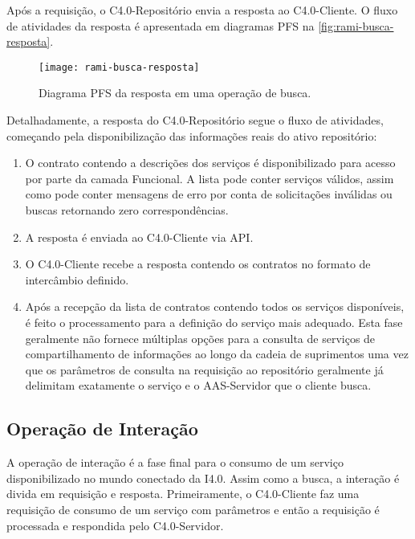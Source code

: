 Após a requisição, o C4.0-Repositório envia a resposta ao C4.0-Cliente. O fluxo de atividades da resposta é apresentada em diagramas PFS na \autoref{fig:rami-busca-resposta}.

\begin{figure}[htb]
	\centering
	\texttt{[image: rami-busca-resposta]}
	\caption{Diagrama PFS da resposta em uma operação de busca.}
	\label{fig:rami-busca-resposta}
\end{figure}

Detalhadamente, a resposta do C4.0-Repositório segue o fluxo de atividades, começando pela disponibilização das informações reais do ativo repositório:

\begin{enumerate}
	\item O contrato contendo a descrições dos serviços é disponibilizado para acesso por parte da camada Funcional. A lista  pode conter serviços válidos, assim como pode conter mensagens de erro por conta de solicitações inválidas ou buscas retornando zero correspondências.

	\item A resposta é enviada ao C4.0-Cliente via API.

	\item O C4.0-Cliente recebe a resposta contendo os contratos no formato de intercâmbio definido.

	\item Após a recepção da lista de contratos contendo todos os serviços disponíveis, é feito o processamento para a definição do serviço mais adequado. Esta fase geralmente não fornece múltiplas opções para a consulta de serviços de compartilhamento de informações ao longo da cadeia de suprimentos uma vez que os parâmetros de consulta na requisição ao repositório geralmente já delimitam exatamente o serviço e o AAS-Servidor que o cliente busca.
\end{enumerate}

\subsection{Operação de Interação}

A operação de interação é a fase final para o consumo de um serviço disponibilizado no mundo conectado da I4.0. Assim como a busca, a interação é divida em requisição e resposta. Primeiramente, o C4.0-Cliente faz uma requisição de consumo de um serviço com parâmetros e então a requisição é processada e respondida pelo C4.0-Servidor.

